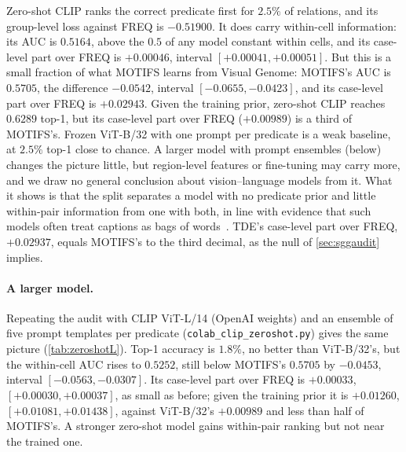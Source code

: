 Zero-shot CLIP ranks the correct predicate first for $2.5\%$ of relations, and its group-level
loss against FREQ is $-0.51900$. It does carry within-cell information: its AUC is $0.5164$,
above the $0.5$ of any model constant within cells, and its case-level part over FREQ is
$+0.00046$, interval $[+0.00041,+0.00051]$. But this is a small fraction of what MOTIFS learns
from Visual Genome: MOTIFS's AUC is $0.5705$, the difference $-0.0542$, interval
$[-0.0655,-0.0423]$, and its case-level part over FREQ is $+0.02943$. Given the training prior,
zero-shot CLIP reaches $0.6289$ top-1, but its case-level part over FREQ ($+0.00989$) is a third
of MOTIFS's. Frozen ViT-B/32 with one prompt per predicate is a weak baseline, at $2.5\%$ top-1 close to
chance. A larger model with prompt ensembles (below) changes the picture little, but
region-level features or fine-tuning may carry more, and we draw no general conclusion about
vision--language models from it. What it shows is that the split separates a model with no
predicate prior and little within-pair information from one with both, in line with evidence
that such models often treat captions as bags of words~\cite{yuksekgonul2023when}. TDE's case-level part
over FREQ, $+0.02937$, equals MOTIFS's to the third decimal, as the null of \cref{sec:sggaudit}
implies.

\paragraph{A larger model.} Repeating the audit with CLIP ViT-L/14 (OpenAI weights) and an
ensemble of five prompt templates per predicate (\texttt{colab\_clip\_zeroshot.py}) gives
the same picture (\cref{tab:zeroshotL}). Top-1 accuracy is $1.8\%$, no better than ViT-B/32's,
but the within-cell AUC rises to $0.5252$, still below MOTIFS's $0.5705$ by $-0.0453$,
interval $[-0.0563,-0.0307]$. Its case-level part over FREQ is $+0.00033$,
$[+0.00030,+0.00037]$, as small as before; given the training prior it is $+0.01260$,
$[+0.01081,+0.01438]$, against ViT-B/32's $+0.00989$ and less than half of MOTIFS's.
A stronger zero-shot model gains within-pair ranking but not near the trained one.

\begin{table}[t]
\centering
\footnotesize
\setlength\tabcolsep{4pt}
\caption{\textbf{Zero-shot CLIP ViT-L/14 with a five-prompt ensemble}, as in
\cref{tab:zeroshot}.}
\label{tab:zeroshotL}

\end{table}

\begin{table}[t]
\centering
\footnotesize
\setlength\tabcolsep{4pt}
\caption{\textbf{Zero-shot CLIP on the canonical relations.} Upper block: matched split
(quadratic, with the log-score case-level part); lower block: top-1 accuracy, within-cell AUC
and fitted temperature. The AUC of zero-shot CLIP + FREQ equals zero-shot CLIP's by
construction.}
\label{tab:zeroshot}

\end{table}
